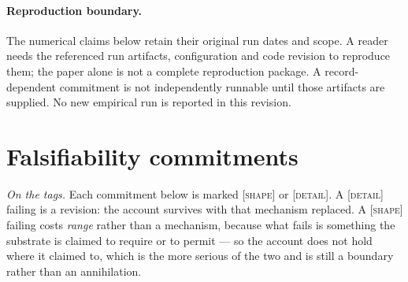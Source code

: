 \documentclass[11pt,a4paper]{article}
\theoremstyle{remark}
\begin{document}
\paragraph{Reproduction boundary.} The numerical claims below retain their
original run dates and scope. A reader needs the referenced run artifacts,
configuration and code revision to reproduce them; the paper alone is not a
complete reproduction package. A record-dependent commitment is not independently
runnable until those artifacts are supplied. No new empirical run is reported
in this revision.

\section{Falsifiability commitments}\label{sec:falsifiability}

\noindent\emph{On the tags.} Each commitment below is marked \textsc{[shape]} or \textsc{[detail]}.
A \textsc{[detail]} failing is a revision: the account survives with that mechanism replaced. A
\textsc{[shape]} failing costs \emph{range} rather than a mechanism, because what fails is something
the substrate is claimed to require or to permit --- so the account does not hold where it claimed to,
which is the more serious of the two and is still a boundary rather than an annihilation.
\end{document}
